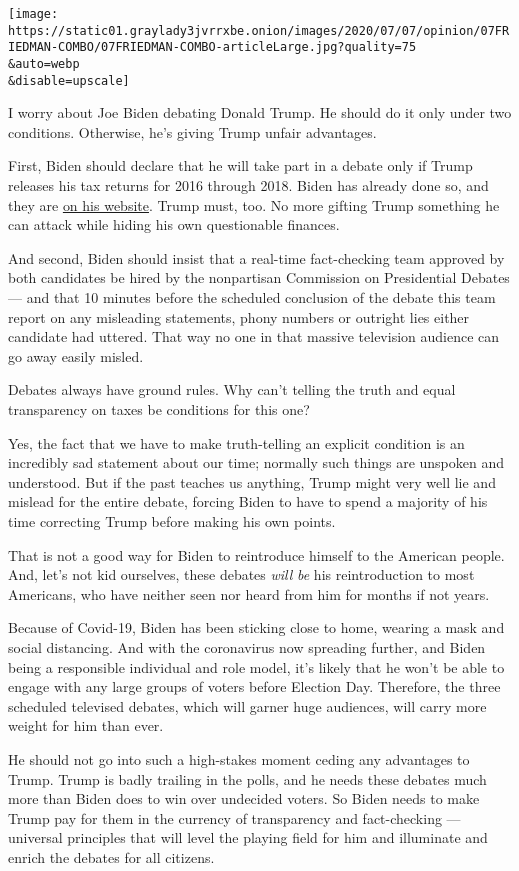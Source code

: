 \texttt{[image: https://static01.graylady3jvrrxbe.onion/images/2020/07/07/opinion/07FRIEDMAN-COMBO/07FRIEDMAN-COMBO-articleLarge.jpg?quality=75\\\&auto=webp\\\&disable=upscale]}

I worry about Joe Biden debating Donald Trump. He should do it only
under two conditions. Otherwise, he's giving Trump unfair advantages.

First, Biden should declare that he will take part in a debate only if
Trump releases his tax returns for 2016 through 2018. Biden has already
done so, and they are
\href{https://joebiden.com/financial-disclosure/}{on his website}. Trump
must, too. No more gifting Trump something he can attack while hiding
his own questionable finances.

And second, Biden should insist that a real-time fact-checking team
approved by both candidates be hired by the nonpartisan Commission on
Presidential Debates --- and that 10 minutes before the scheduled
conclusion of the debate this team report on any misleading statements,
phony numbers or outright lies either candidate had uttered. That way no
one in that massive television audience can go away easily misled.

Debates always have ground rules. Why can't telling the truth and equal
transparency on taxes be conditions for this one?

Yes, the fact that we have to make truth-telling an explicit condition
is an incredibly sad statement about our time; normally such things are
unspoken and understood. But if the past teaches us anything, Trump
might very well lie and mislead for the entire debate, forcing Biden to
have to spend a majority of his time correcting Trump before making his
own points.

That is not a good way for Biden to reintroduce himself to the American
people. And, let's not kid ourselves, these debates \emph{will}
\emph{be} his reintroduction to most Americans, who have neither seen
nor heard from him for months if not years.

Because of Covid-19, Biden has been sticking close to home, wearing a
mask and social distancing. And with the coronavirus now spreading
further, and Biden being a responsible individual and role model, it's
likely that he won't be able to engage with any large groups of voters
before Election Day. Therefore, the three scheduled televised debates,
which will garner huge audiences, will carry more weight for him than
ever.

He should not go into such a high-stakes moment ceding any advantages to
Trump. Trump is badly trailing in the polls, and he needs these debates
much more than Biden does to win over undecided voters. So Biden needs
to make Trump pay for them in the currency of transparency and
fact-checking --- universal principles that will level the playing field
for him and illuminate and enrich the debates for all citizens.

